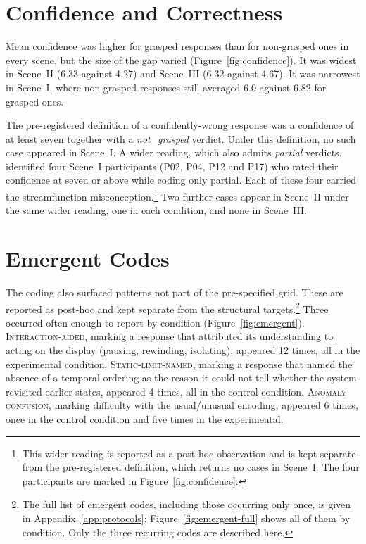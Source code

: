 \section{Confidence and Correctness}
\label{sec:res-confidence}

Mean confidence was higher for grasped responses than for non-grasped ones in every scene, but the size of the gap varied (Figure~\ref{fig:confidence}). It was widest in Scene~II (6.33 against 4.27) and Scene~III (6.32 against 4.67). It was narrowest in Scene~I, where non-grasped responses still averaged 6.0 against 6.82 for grasped ones.

The pre-registered definition of a confidently-wrong response was a confidence of at least seven together with a \emph{not\_grasped} verdict. Under this definition, no such case appeared in Scene~I. A wider reading, which also admits \emph{partial} verdicts, identified four Scene~I participants (P02, P04, P12 and P17) who rated their confidence at seven or above while coding only partial. Each of these four carried the streamfunction misconception.\footnote{This wider reading is reported as a post-hoc observation and is kept separate from the pre-registered definition, which returns no cases in Scene~I. The four participants are marked in Figure~\ref{fig:confidence}.} Two further cases appear in Scene~II under the same wider reading, one in each condition, and none in Scene~III.

\section{Emergent Codes}
\label{sec:res-emergent}

The coding also surfaced patterns not part of the pre-specified grid. These are reported as post-hoc and kept separate from the structural targets.\footnote{The full list of emergent codes, including those occurring only once, is given in Appendix~\ref{app:protocols}; Figure~\ref{fig:emergent-full} shows all of them by condition. Only the three recurring codes are described here.} Three occurred often enough to report by condition (Figure~\ref{fig:emergent}). \textsc{Interaction-aided}, marking a response that attributed its understanding to acting on the display (pausing, rewinding, isolating), appeared 12 times, all in the experimental condition. \textsc{Static-limit-named}, marking a response that named the absence of a temporal ordering as the reason it could not tell whether the system revisited earlier states, appeared 4 times, all in the control condition. \textsc{Anomaly-confusion}, marking difficulty with the usual/unusual encoding, appeared 6 times, once in the control condition and five times in the experimental.

